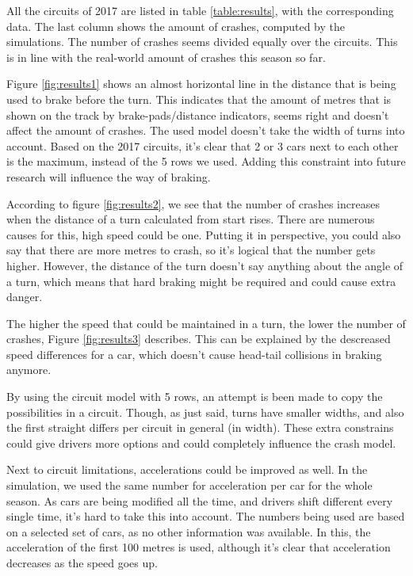 All the circuits of 2017 are listed in table \ref{table:results}, with the corresponding data. The last column shows the amount of crashes, computed by the simulations. The number of crashes seems divided equally over the circuits. This is in line with the real-world amount of crashes this season so far.

Figure \ref{fig:results1} shows an almost horizontal line in the distance that is being used to brake before the turn. This indicates that the amount of metres that is shown on the track by brake-pads/distance indicators, seems right and doesn't affect the amount of crashes. The used model doesn't take the width of turns into account. Based on the 2017 circuits, it's clear that 2 or 3 cars next to each other is the maximum, instead of the 5 rows we used. Adding this constraint into future research will influence the way of braking.

According to figure \ref{fig:results2}, we see that the number of crashes increases when the distance of a turn calculated from start rises. There are numerous causes for this, high speed could be one. Putting it in perspective, you could also say that there are more metres to crash, so it's logical that the number gets higher. However, the distance of the turn doesn't say anything about the angle of a turn, which means that hard braking might be required and could cause extra danger.

The higher the speed that could be maintained in a turn, the lower the number of crashes, Figure \ref{fig:results3} describes. This can be explained by the descreased speed differences for a car, which doesn't cause head-tail collisions in braking anymore.

By using the circuit model with 5 rows, an attempt is been made to copy the possibilities in a circuit. Though, as just said, turns have smaller widths, and also the first straight differs per circuit in general (in width). These extra constrains could give drivers more options and could completely influence the crash model.

Next to circuit limitations, accelerations could be improved as well. In the simulation, we used the same number for acceleration per car for the whole season. As cars are being modified all the time, and drivers shift different every single time, it's hard to take this into account. The numbers being used are based on a selected set of cars, as no other information was available. In this, the acceleration of the first 100 metres is used, although it's clear that acceleration decreases as the speed goes up.

